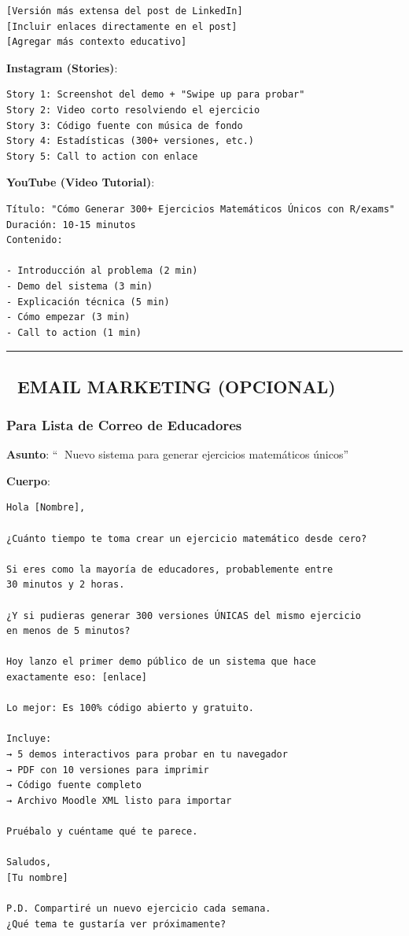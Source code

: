 \documentclass[
]{article}
\begin{document}
\begin{verbatim}
[Versión más extensa del post de LinkedIn]
[Incluir enlaces directamente en el post]
[Agregar más contexto educativo]
\end{verbatim}

\textbf{Instagram (Stories)}:

\begin{verbatim}
Story 1: Screenshot del demo + "Swipe up para probar"
Story 2: Video corto resolviendo el ejercicio
Story 3: Código fuente con música de fondo
Story 4: Estadísticas (300+ versiones, etc.)
Story 5: Call to action con enlace
\end{verbatim}

\textbf{YouTube (Video Tutorial)}:

\begin{verbatim}
Título: "Cómo Generar 300+ Ejercicios Matemáticos Únicos con R/exams"
Duración: 10-15 minutos
Contenido:

- Introducción al problema (2 min)
- Demo del sistema (3 min)
- Explicación técnica (5 min)
- Cómo empezar (3 min)
- Call to action (1 min)
\end{verbatim}

\begin{center}\rule{0.5\linewidth}{0.5pt}\end{center}

\subsection{📧 EMAIL MARKETING
(OPCIONAL)}\label{email-marketing-opcional}

\subsubsection{Para Lista de Correo de
Educadores}\label{para-lista-de-correo-de-educadores}

\textbf{Asunto}: ``🎯 Nuevo sistema para generar ejercicios matemáticos
únicos''

\textbf{Cuerpo}:

\begin{verbatim}
Hola [Nombre],

¿Cuánto tiempo te toma crear un ejercicio matemático desde cero?

Si eres como la mayoría de educadores, probablemente entre
30 minutos y 2 horas.

¿Y si pudieras generar 300 versiones ÚNICAS del mismo ejercicio
en menos de 5 minutos?

Hoy lanzo el primer demo público de un sistema que hace
exactamente eso: [enlace]

Lo mejor: Es 100% código abierto y gratuito.

Incluye:
→ 5 demos interactivos para probar en tu navegador
→ PDF con 10 versiones para imprimir
→ Código fuente completo
→ Archivo Moodle XML listo para importar

Pruébalo y cuéntame qué te parece.

Saludos,
[Tu nombre]

P.D. Compartiré un nuevo ejercicio cada semana.
¿Qué tema te gustaría ver próximamente?
\end{verbatim}
\end{document}
